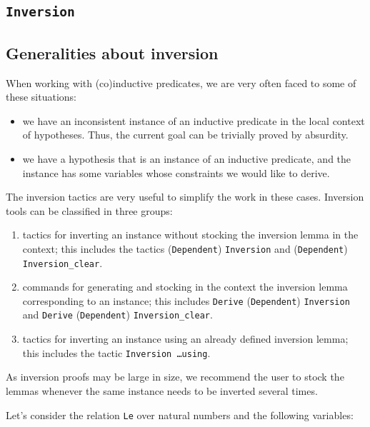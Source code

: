 \begin{coq_example*}
\section{{\tt Inversion}}
\label{Inversion-examples}

\subsection*{Generalities about inversion}

When working with (co)inductive predicates, we are very often faced to
some of these situations:
\begin{itemize}
\item we have an inconsistent instance of an inductive predicate in the
  local context of hypotheses. Thus, the current goal can be trivially
  proved by absurdity. 
\item we have a hypothesis that is an instance of an inductive
  predicate, and the instance has some variables whose constraints we
  would like to derive.
\end{itemize}

The inversion tactics are very useful to simplify the work in these
cases. Inversion tools can be classified in three groups:

\begin{enumerate}
\item tactics for inverting an instance without stocking the inversion
  lemma in the context; this includes the tactics
  (\texttt{Dependent})  \texttt{Inversion} and
 (\texttt{Dependent}) \texttt{Inversion\_clear}.
\item commands for generating and stocking in the context the inversion
  lemma corresponding to an instance; this includes \texttt{Derive}
  (\texttt{Dependent}) \texttt{Inversion} and \texttt{Derive}
  (\texttt{Dependent}) \texttt{Inversion\_clear}.
\item tactics for inverting an instance using an already defined
  inversion lemma; this includes the tactic \texttt{Inversion \ldots using}.
\end{enumerate}

As inversion proofs may be large in size, we recommend the user to
stock the lemmas whenever the same instance needs to be inverted
several times.

\firstexample
{}

Let's consider the relation \texttt{Le} over natural numbers and the
following variables:


\end{coq_example*}
